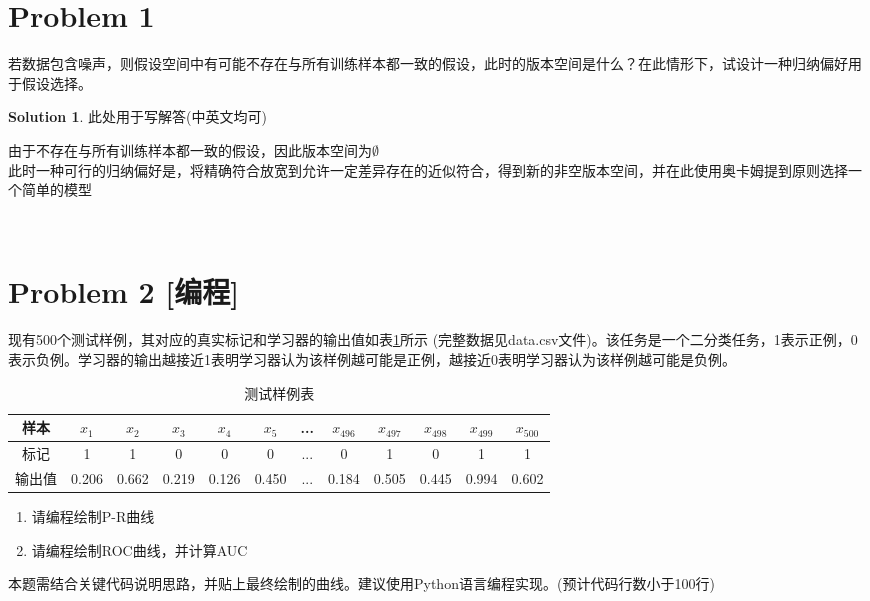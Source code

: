 \documentclass[a4paper,UTF8]{article}
\theoremstyle{definition}
\newtheorem*{solution}{Solution}
\begin{document}
\newpage
\section*{Problem 1}
若数据包含噪声，则假设空间中有可能不存在与所有训练样本都一致的假设，此时的版本空间是什么？在此情形下，试设计一种归纳偏好用于假设选择。
\begin{solution}
此处用于写解答(中英文均可)
~\\
\begin{tcolorbox}
由于不存在与所有训练样本都一致的假设，因此版本空间为$\emptyset$ \\
此时一种可行的归纳偏好是，将精确符合放宽到允许一定差异存在的近似符合，得到新的非空版本空间，并在此使用奥卡姆提到原则选择一个简单的模型
\end{tcolorbox}
~\\
\end{solution}

\section*{Problem 2 [编程]} 
现有500个测试样例，其对应的真实标记和学习器的输出值如表\ref{table:roc}所示 (完整数据见data.csv文件)。该任务是一个二分类任务，1表示正例，0表示负例。学习器的输出越接近1表明学习器认为该样例越可能是正例，越接近0表明学习器认为该样例越可能是负例。
\begin{table}[!h]
	\centering
	\caption{测试样例表} \vspace{2mm}\label{table:roc}
	\begin{tabular}{c|c c c c c c c c c c c}\hline
		样本 & $x_1$ & $x_2$ & $x_3$  & $x_4$  & $x_5$&...& $x_{496}$& $x_{497}$ & $x_{498}$ & $x_{499}$ & $x_{500}$ \\
		\hline
		标记 & 1  & 1 &  0 &  0  & 0 &... &0& 1 & 0 & 1 & 1\\
		\hline
		输出值 & 0.206  & 0.662 &  0.219 &  0.126  & 0.450 & ... & 0.184&0.505 & 0.445 & 0.994 & 0.602\\
		\hline
	\end{tabular}
\end{table}
\begin{enumerate}[ {(}1{)}]
\item 请编程绘制P-R曲线
\item 请编程绘制ROC曲线，并计算AUC
\end{enumerate}
本题需结合关键代码说明思路，并贴上最终绘制的曲线。建议使用Python语言编程实现。(预计代码行数小于100行)
\end{document}
